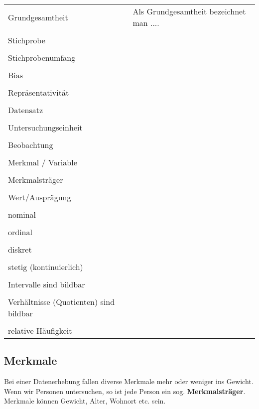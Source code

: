 \begin{tabular}{p{5cm}|l}
  Grundgesamtheit         &  Als Grundgesamtheit bezeichnet man ....\\
  \\
  Stichprobe\index{Stichprobe}              & \\
  \\
  Stichprobenumfang       & \\
  \\
  Bias\index{Bias}                   & \\
  \\ 
  Repräsentativität       & \\
  \\
  Datensatz\index{Datensatz}               & \\
  \\
  Untersuchungseinheit\index{Untersuchungseinheit}    & \\
  \\
  Beobachtung             & \\
  \\
  Merkmal\index{Merkmal} / Variable      & \\
  \\
  Merkmalsträger\index{Merkmalsträger}          & \\
  \\
  Wert/Ausprägung         & \\
  \\
  nominal\index{nominal}                 & \\
  \\
  ordinal\index{ordinal}                 & \\
  \\
  diskret\index{diskret}                 & \\
  \\
  stetig (kontinuierlich) & \\
  \\
  Intervalle\index{Intervalle} sind bildbar & \\
  \\
  Verhältnisse\index{Verhältnisse!bildbar} (Quotienten) sind bildbar & \\
  \\
  relative Häufigkeit\index{Häufigkeit!relative}     & \\
\end{tabular}%
\newpage


\subsection{Merkmale}
Bei einer Datenerhebung fallen diverse Merkmale mehr oder weniger ins
Gewicht. Wenn wir Personen untersuchen, so ist jede Person ein
sog. \textbf{Merkmalsträger}. Merkmale können Gewicht, Alter, Wohnort
etc. sein.

